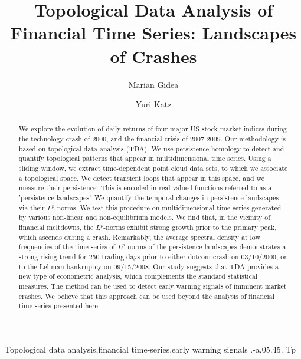 \documentclass[preprint,12pt]{elsarticle}
\theoremstyle{definition}
\theoremstyle{remark}
\numberwithin{equation}{section}
\theoremstyle{definition}
\begin{document}
\begin{frontmatter}

\title{Topological Data Analysis of Financial Time Series: Landscapes of  Crashes}

\author{Marian  Gidea}
\address{Yeshiva University, Department of Mathematical Sciences, New York, NY 10016, USA}


\author{Yuri Katz}
\address{S\&P Global Market Intelligence, 55 Water Str., New York, NY 10040, USA}

\begin{abstract}
We explore the evolution of daily returns of four major US stock market indices during the technology crash of 2000, and the financial crisis of 2007-2009. Our methodology is based on  topological data analysis (TDA). We use  persistence homology to detect and quantify topological patterns that appear in multidimensional time series. Using a sliding window, we extract  time-dependent point cloud data sets, to which we associate a topological space. We detect transient loops that appear in this space, and we measure their persistence. This is encoded in real-valued functions referred to as a 'persistence landscapes'. We quantify the temporal changes in persistence landscapes via their  $L^p$-norms. We test this procedure on multidimensional time series generated by various non-linear and non-equilibrium models. We find that, in the vicinity of financial meltdowns, the  $L^p$-norms exhibit strong growth prior to the primary peak, which ascends during a crash. Remarkably, the average spectral density at low frequencies of the time series of  $L^p$-norms of the persistence landscapes demonstrates a strong rising trend for 250 trading days prior to either dotcom crash on 03/10/2000, or to the Lehman bankruptcy on 09/15/2008. Our study suggests that TDA provides a new type of  econometric analysis, which complements the standard statistical measures. The method can be used to detect early warning signals of imminent market crashes. We believe that this approach can be used beyond the analysis of  financial time series presented here.
\end{abstract}
\begin{keyword}
Topological data analysis\sep financial time-series\sep early warning signals
.-a\sep  05.45. Tp
\end{keyword}
\end{frontmatter}
\end{document}
